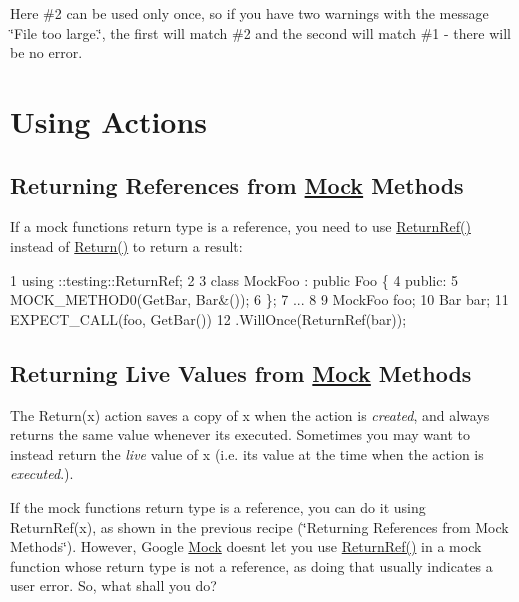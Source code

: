 Here \#2 can be used only once, so if you have two warnings with the message {\ttfamily \char`\"{}\+File too large.\char`\"{}}, the first will match \#2 and the second will match \#1 -\/ there will be no error.

\section*{Using Actions}

\subsection*{Returning References from \hyperlink{classMock}{Mock} Methods}

If a mock function\textquotesingle{}s return type is a reference, you need to use {\ttfamily \hyperlink{namespacetesting_a18eda8fe9c89ee856c199a2e04ca1641}{Return\+Ref()}} instead of {\ttfamily \hyperlink{namespacetesting_af6d1c13e9376c77671e37545cd84359c}{Return()}} to return a result\+:


\begin{DoxyCode}
1 using ::testing::ReturnRef;
2 
3 class MockFoo : public Foo \{
4  public:
5   MOCK\_METHOD0(GetBar, Bar&());
6 \};
7 ...
8 
9   MockFoo foo;
10   Bar bar;
11   EXPECT\_CALL(foo, GetBar())
12       .WillOnce(ReturnRef(bar));
\end{DoxyCode}


\subsection*{Returning Live Values from \hyperlink{classMock}{Mock} Methods}

The {\ttfamily Return(x)} action saves a copy of {\ttfamily x} when the action is {\itshape created}, and always returns the same value whenever it\textquotesingle{}s executed. Sometimes you may want to instead return the {\itshape live} value of {\ttfamily x} (i.\+e. its value at the time when the action is {\itshape executed}.).

If the mock function\textquotesingle{}s return type is a reference, you can do it using {\ttfamily Return\+Ref(x)}, as shown in the previous recipe (\char`\"{}\+Returning References
from Mock Methods\char`\"{}). However, Google \hyperlink{classMock}{Mock} doesn\textquotesingle{}t let you use {\ttfamily \hyperlink{namespacetesting_a18eda8fe9c89ee856c199a2e04ca1641}{Return\+Ref()}} in a mock function whose return type is not a reference, as doing that usually indicates a user error. So, what shall you do?

